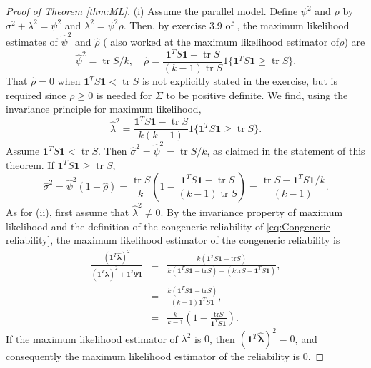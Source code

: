 \documentclass[twoside]{article}
\DeclareMathOperator{\tr}{tr}
\begin{document}
\begin{proof}[Proof of Theorem \ref{thm:ML}]\label{proof:ML}
(i) Assume the parallel model. Define $\psi^{2}$ and $\rho$ by
$\sigma^{2}+\lambda^{2}=\psi^{2}$ and $\lambda^{2}=\psi^{2}\rho$.
Then, by exercise 3.9 of \citet[][p. 114]{Muirhead2009-kq}, the maximum likelihood estimates of $\hat{\psi}^{2}$
and $\hat{\rho}$ (\citet[][Section B]{Kristof1963-tb} also worked at the maximum likelihood estimator of$\rho$) are
\[
\hat{\psi}^{2}=\tr S/k,\quad\hat{\rho}=\frac{\boldsymbol{1}^{T}S\boldsymbol{1}-\tr S}{(k-1)\tr S}1\{\boldsymbol{1}^{T}S\boldsymbol{1}\geq\tr S\}.
\]
That $\hat{\rho}=0$ when $\boldsymbol{1}^{T}S\boldsymbol{1}<\tr S$
is not explicitly stated in the exercise, but is required since $\rho\geq0$
is needed for $\Sigma$ to be positive definite. We find, using the invariance
principle for maximum likelihood,
\[
\hat{\lambda}^{2} = \frac{\boldsymbol{1}^{T}S\boldsymbol{1}-\tr S}{k(k-1)}1\{\boldsymbol{1}^{T}S\boldsymbol{1}\geq\tr S\}.
\]
Assume $\boldsymbol{1}^{T}S\boldsymbol{1}<\tr S$. Then $\hat{\sigma}^{2}=\hat{\psi}^{2}=\tr S/k$,
as claimed in the statement of this theorem. If $\boldsymbol{1}^{T}S\boldsymbol{1}\geq\tr S$,
\begin{equation*}
\hat{\sigma}^{2} = \hat{\psi}^{2}(1-\hat{\rho})
 = \frac{\tr S}{k}\left(1-\frac{\boldsymbol{1}^{T}S\boldsymbol{1}-\tr S}{(k-1)\tr S}\right)
 = \frac{\tr S-\boldsymbol{1}^{T}S\boldsymbol{1}/k}{(k-1)}.
\end{equation*}
As for (ii), first assume that $\hat{\lambda}^2\neq 0$. By the invariance property of maximum likelihood and the definition of the congeneric reliability of \cref{eq:Congeneric reliability}, the maximum likelihood estimator of the congeneric reliability is
\begin{eqnarray*}
\frac{(\boldsymbol{1}^{T}\mathbf{\hat{\lambda}})^{2}}{(\boldsymbol{1}^{T}\mathbf{\hat{\lambda}})^{2}+\boldsymbol{1}^{T}\Psi\boldsymbol{1}} & = & \frac{k(\boldsymbol{1}^{T}S\boldsymbol{1}-\textrm{tr}S)}{k(\boldsymbol{1}^{T}S\boldsymbol{1}-\textrm{tr}S)+(k\textrm{tr}S-\boldsymbol{1}^{T}S\boldsymbol{1})},\\
 & = & \frac{k(\boldsymbol{1}^{T}S\boldsymbol{1}-\textrm{tr}S)}{(k-1)\boldsymbol{1}^{T}S\boldsymbol{1}},\\
 & = & \frac{k}{k-1}\left(1-\frac{\textrm{tr}S}{\boldsymbol{1}^{T}S\boldsymbol{1}}\right).
\end{eqnarray*}
If the maximum likelihood estimator of $\lambda^{2}$ is $0$, then $(\boldsymbol{1}^{T}\mathbf{\hat{\lambda}})^{2}=0$,
and consequently the maximum likelihood estimator of the reliability is $0.$
\end{proof}
\end{document}
